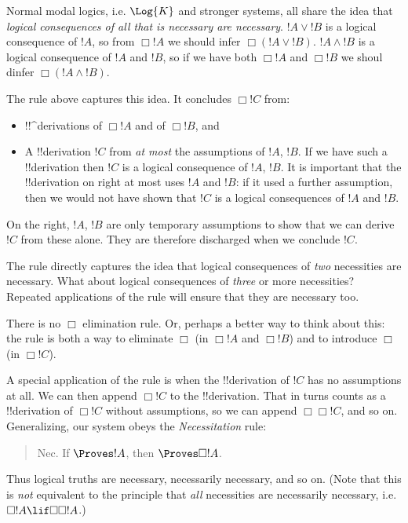 \documentclass[../../../include/open-logic-section]{subfiles}
\begin{document}
\begin{explain}
Normal modal logics, i.e. $\Log{K}$ and stronger systems, all share the 
idea that \emph{logical consequences of all that is necessary are necessary}.
$!A\lor !B$ is a logical consequence of $!A$, so from $\Box !A$ we 
should infer $\Box (!A\lor !B)$. $!A\land !B$ is a logical consequence 
of $!A$ and $!B$, so if we have both $\Box !A$ and $\Box !B$ we 
shoul dinfer $\Box(!A\land !B)$. 

The rule above captures this idea. It concludes $\Box!C$ from:
\begin{itemize}
\item !!^{derivation}s of $\Box!A$ and of $\Box!B$, and
\item A !!{derivation} $!C$ from \emph{at most} the assumptions of
$!A$, $!B$. If we have such a !!{derivation} then $!C$ is a logical
consequence of $!A$, $!B$. It is important that the !!{derivation} on
right at most uses $!A$ and $!B$: if it used a further assumption,
then we would not have shown that $!C$ is a logical consequences of
$!A$ and $!B$.
\end{itemize}
On the right, $!A$, $!B$ are only temporary assumptions to show
that we can derive $!C$ from these alone. They are therefore discharged
when we conclude $!C$.

The rule directly captures the idea that logical consequences of \emph{two}
necessities are necessary. What about logical consequences of \emph{three}
or more necessities? Repeated applications of the 
rule will ensure that they are necessary too.

There is no $\Box$ elimination rule. Or, perhaps a better way to think about 
this: the rule is both a way to eliminate $\Box$ (in $\Box!A$ 
and $\Box!B$) and to introduce $\Box$ (in $\Box!C$).
\end{explain}

\begin{ex}
A special application of the rule is when the !!{derivation} of $!C$
has no assumptions at all. We can then append $\Box!C$ to the
!!{derivation}. That in turns counts as a !!{derivation} of $\Box!C$
without assumptions, so we can append $\Box\Box!C$, and so on.
Generalizing, our system obeys the \emph{Necessitation} rule:
\begin{quote}
    Nec. If $\Proves !A$, then $\Proves \Box!A$.
\end{quote}
Thus logical truths are necessary, necessarily necessary, and so on.
(Note that this is \emph{not} equivalent to the principle that \emph{all}
necessities are necessarily necessary, i.e. $\Box!A\lif\Box\Box!A$.)
\end{ex}
\end{document}
